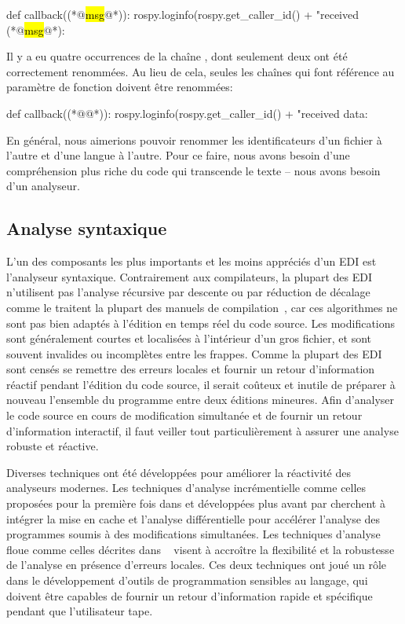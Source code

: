 \begin{pythonlisting}
def callback((*@\hl{msg}@*)):
    rospy.loginfo(rospy.get_caller_id() + "received (*@\hl{msg}@*): %
\end{pythonlisting}
%
Il y a eu quatre occurrences de la chaîne , dont seulement deux ont été correctement renommées. Au lieu de cela, seules les chaînes qui font référence au paramètre de fonction doivent être renommées:

\newcommand{\cfbox}[2]{\colorlet{\currentcolor}{.}{\color{#1}\fbox{\color{\currentcolor}#2}}}

\begin{pythonlisting}
def callback((*@\cfbox{red}{data}@*)):
    rospy.loginfo(rospy.get_caller_id() + "received data: %
\end{pythonlisting}
%
En général, nous aimerions pouvoir renommer les identificateurs d'un fichier à l'autre et d'une langue à l'autre. Pour ce faire, nous avons besoin d'une compréhension plus riche du code qui transcende le texte -- nous avons besoin d'un analyseur.

\subsection{Analyse syntaxique}\label{subsec:the-parser}

L'un des composants les plus importants et les moins appréciés d'un EDI est l'analyseur syntaxique. Contrairement aux compilateurs, la plupart des EDI n'utilisent pas l'analyse récursive par descente ou par réduction de décalage comme le traitent la plupart des manuels de compilation~\citep{appel2003modern}, car ces algorithmes ne sont pas bien adaptés à l'édition en temps réel du code source. Les modifications sont généralement courtes et localisées à l'intérieur d'un gros fichier, et sont souvent invalides ou incomplètes entre les frappes. Comme la plupart des EDI sont censés se remettre des erreurs locales et fournir un retour d'information réactif pendant l'édition du code source, il serait coûteux et inutile de préparer à nouveau l'ensemble du programme entre deux éditions mineures. Afin d'analyser le code source en cours de modification simultanée et de fournir un retour d'information interactif, il faut veiller tout particulièrement à assurer une analyse robuste et réactive.

Diverses techniques ont été développées pour améliorer la réactivité des analyseurs modernes. Les techniques d'analyse incrémentielle comme celles proposées pour la première fois dans \citet{ghezzi1979incremental} et développées plus avant par \citet{wagner1997practical,wagner1997incremental} cherchent à intégrer la mise en cache et l'analyse différentielle pour accélérer l'analyse des programmes soumis à des modifications simultanées. Les techniques d'analyse floue comme celles décrites dans ~\citet{koppler1997systematic} visent à accroître la flexibilité et la robustesse de l'analyse en présence d'erreurs locales. Ces deux techniques ont joué un rôle dans le développement d'outils de programmation sensibles au langage, qui doivent être capables de fournir un retour d'information rapide et spécifique pendant que l'utilisateur tape.

